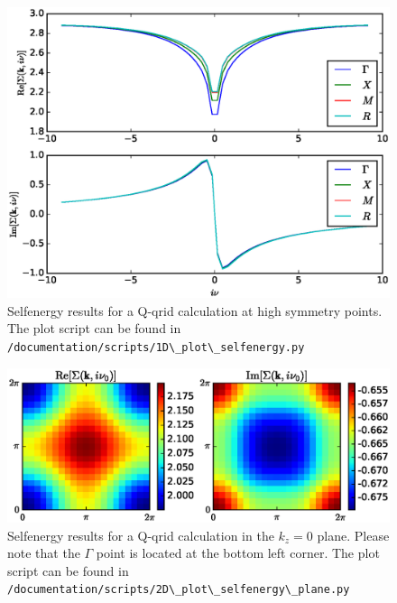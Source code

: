 \documentclass[a4paper,11pt]{article}
\numberwithin{equation}{section} %
\begin{document}
\begin{figure}[H]
\begin{center}
\includegraphics[scale=0.75]{qgrid.eps}
\caption{Selfenergy results for a Q-qrid calculation at high symmetry points. The plot script can be found in {\color{blue}\protect\Verb+/documentation/scripts/1D\_plot\_selfenergy.py+}}
\end{center}
\end{figure}

\begin{figure}[H]
\begin{center}
\includegraphics[clip, trim=0cm 3cm 0cm 3cm, scale=0.75]{qgrid_plane.eps}
\caption{Selfenergy results for a Q-qrid calculation in the $k_z=0$ plane. Please note that the $\Gamma$ point is located at the bottom left corner. The plot script can be found in {\color{blue}\protect\Verb+/documentation/scripts/2D\_plot\_selfenergy\_plane.py+}}
\end{center}
\end{figure}

\newpage
\end{document}
